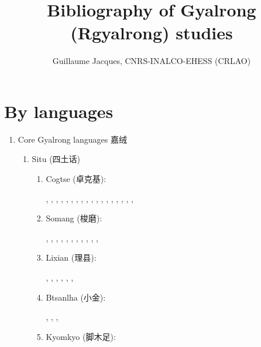 \documentclass[oldfontcommands,oneside,a4paper,11pt]{article}
\newcommand{\zh}[1]{{\cn #1}}
\newcommand{\langue}[2]{#1}
\begin{document}
  \title{\langue{Bibliography of Gyalrong (Rgyalrong) studies}{Bibliographie des études rgyalrong}}
 
\author{Guillaume Jacques, CNRS-INALCO-EHESS (CRLAO)}
\maketitle
\sloppy



\section{\langue{By languages}{Publications classées par langue étudiée}}
\begin{enumerate}
\item \langue{Core Gyalrong languages \zh{嘉绒}}{Rgyalrong \zh{嘉绒}}
\begin{enumerate}
\item Situ (\zh{四土话})
\begin{enumerate}
\item Cogtse (\zh{卓克基}): 

\citet{nagano79prefixes}, \citet{nagano79rhymes}, \citet{lin83gouci}, \citet{nagano84}, \citet{linxr93jiarong}, \citet{huang93ka}, \citet{hsieh99zhuokeji}, \citet{wei01ka}, \citet{lin02dimension}, \citet{huangsun02}, \citet{youjing03zhuokeji}, \citet{nagano03cogtse}, \citet{jacques03s.houzhui}, \citet{jacksonlin07}, \citet{lin09phd}, \citet{lin11direction},  \citet{jacques12agreement}, \citet{gates12situ}, \citet{linyj12tone}

\item Somang (\zh{梭磨}): 

\citet{jin57suomo}, \citet{jin58suomo}, \citet{bauman75}, \citet{delancey81ergativity},  \citet{delancey81direction}, \citet{qu83rencheng}, \citet{dai92suomo}, \citet{linxr93jiarong}, \citet{yanmuchu05houzhui}, \citet{yanmuchu05sa}, \citet{yanmuchu06hechengci}, \citet{yanmuchu14cihui}

\item Lixian (\zh{理县}): 

\citet{wolfenden36jyarung}, \citet{wen40paslok}, \citet{jin49jyarung}, \citet{chang68gyarung}, \citet{chang75gyarung}, \citet{linxr93jiarong},

\item Btsanlha (\zh{小金}): 

\citet{mansier83tsenla}, \citet{linxr93jiarong}, \citet{btsanlha09dict}, \citet{gates12situ}

\item Kyomkyo (\zh{脚木足}): 


\end{enumerate}
\end{enumerate}
\end{enumerate}
\end{document}
